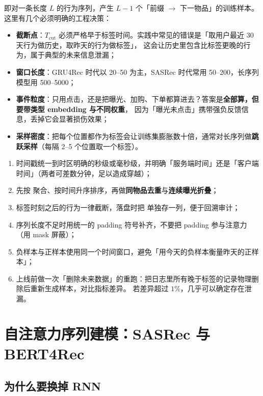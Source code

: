 即对一条长度 $L$ 的行为序列，产生 $L-1$ 个「前缀 $\to$ 下一物品」的训练样本。
这里有几个必须明确的工程决策：

\begin{itemize}
  \item \textbf{截断点}：$T_{\text{cut}}$ 必须严格早于标签时间。实践中常见的错误是「取用户最近 30 天行为做历史，取昨天的行为做标签」，
        这会让历史里包含比标签更晚的行为，属于典型的未来信息泄漏；
  \item \textbf{窗口长度}：GRU4Rec 时代以 20--50 为主，SASRec 时代常用 50--200，长序列模型用 500--5000；
  \item \textbf{事件粒度}：只用点击，还是把曝光、加购、下单都算进去？答案是\textbf{全部算，但要带类型 embedding 与不同权重}，
        因为「曝光未点击」携带强负反馈信息，丢掉它会显著损伤效果；
  \item \textbf{采样密度}：把每个位置都作为标签会让训练集膨胀数十倍，通常对长序列做\textbf{跳跃采样}（每隔 2--5 个位置取一个标签）。
\end{itemize}

\begin{toolbox}[行为序列样本构造清单]
\begin{enumerate}
  \item 时间戳统一到时区明确的秒级或毫秒级，并明确「服务端时间」还是「客户端时间」（两者可差数分钟，足以造成穿越）；
  \item 先按  聚合、按时间升序排序，再做\textbf{同物品去重}与\textbf{连续曝光折叠}；
  \item 标签时刻之后的行为一律截断，落盘时把  单独存一列，便于回溯审计；
  \item 序列长度不足时用统一的 padding 符号补齐，不要把 padding 参与注意力（用 mask 屏蔽）；
  \item 负样本与正样本使用同一个时间窗口，避免「用今天的负样本衡量昨天的正样本」；
  \item 上线前做一次「删除未来数据」的重跑：把日志里所有晚于标签的记录物理删除后重新生成样本，对比指标差异。
        若差异超过 $1\%$，几乎可以确定存在泄漏。
\end{enumerate}
\end{toolbox}

\section{自注意力序列建模：SASRec 与 BERT4Rec}

\subsection{为什么要换掉 RNN}

